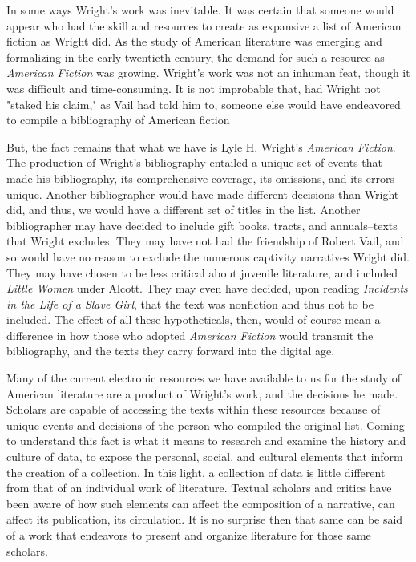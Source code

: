 In some ways Wright's work was inevitable. It was certain that someone would appear who had the skill and resources to create as expansive a list of American fiction as Wright did. As the study of American literature was emerging and formalizing in the early twentieth-century, the demand for such a resource as \textit{American Fiction} was growing. Wright's work was not an inhuman feat, though it was difficult and time-consuming. It is not improbable that, had Wright not "staked his claim," as Vail had told him to, someone else would have endeavored to compile a bibliography of American fiction

But, the fact remains that what we have is Lyle H. Wright's \textit{American Fiction}. The production of Wright's bibliography entailed a unique set of events that made his bibliography, its comprehensive coverage, its omissions, and its errors unique. Another bibliographer would have made different decisions than Wright did, and thus, we would have a different set of titles in the list. Another bibliographer may have decided to include gift books, tracts, and annuals--texts that Wright excludes. They may have not had the friendship of Robert Vail, and so would have no reason to exclude the numerous captivity narratives Wright did. They may have chosen to be less critical about juvenile literature, and included \textit{Little Women} under Alcott. They may even have decided, upon reading \textit{Incidents in the Life of a Slave Girl}, that the text was nonfiction and thus not to be included. The effect of all these hypotheticals, then, would of course mean a difference in how those who adopted \textit{American Fiction} would transmit the bibliography, and the texts they carry forward into the digital age. 

Many of the current electronic resources we have available to us for the study of American literature are a product of Wright's work, and the decisions he made. Scholars are capable of accessing the texts within these resources because of unique events and decisions of the person who compiled the original list. Coming to understand this fact is what it means to research and examine the history and culture of data, to expose the personal, social, and cultural elements that inform the creation of a collection. In this light, a collection of data is little different from that of an individual work of literature. Textual scholars and critics have been aware of how such elements can affect the composition of a narrative, can affect its publication, its circulation. It is no surprise then that same can be said of a work that endeavors to present and organize literature for those same scholars. 

